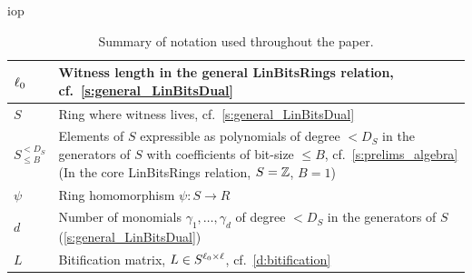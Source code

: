 \begin{lncsappendix}{iop}
\begin{table}[H]
\begin{tabular}{l|l}
        $\ell_0$ & Witness length in the general LinBitsRings relation, cf.\ \cref{s:general_LinBitsDual}  \\
        \hline
                  $S$ & Ring where witness lives, cf.\ \cref{s:general_LinBitsDual}\\
         \hline
         $S_{\leq B}^{<D_S}$ & \makecell[l]{Elements of $S$ expressible as polynomials of degree $<D_S$ in the generators of $S$\\ \quad  with coefficients of bit-size $\leq B$, cf.\ \cref{s:prelims_algebra}\\ \quad  (In the core LinBitsRings relation, $S=\mathbb{Z}$, $B=1$)}\\
         \hline
         $\psi$ & Ring homomorphism $\psi: S\to R$\\
         \hline
         $d$ & \makecell[l]{Number of monomials $\gamma_1,\ldots,\gamma_d$ of degree $<D_S$\\ \quad in the generators of $S$ (\cref{s:general_LinBitsDual})}\\
         \hline
         $L$ & Bitification matrix, $L\in S^{\ell_0\times \ell}$, cf.\ \cref{d:bitification}\\
         \bottomrule
    \end{tabular}
    \caption{Summary of notation used throughout the paper. }
    \label{t:symbols}
\end{table}
\end{lncsappendix}
